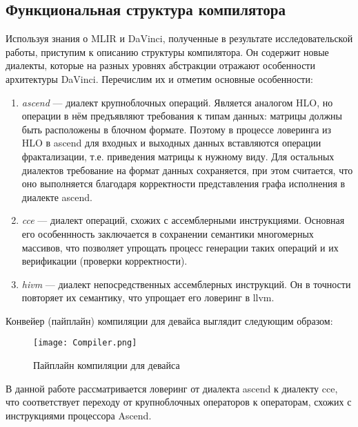 \subsection{Функциональная структура компилятора}
\label{impl:compiler} %

Используя знания о MLIR и DaVinci, полученные в результате исследовательской
работы, приступим к описанию структуры компилятора. Он содержит новые диалекты,
которые на разных уровнях абстракции отражают особенности архитектуры DaVinci.
Перечислим их и отметим основные особенности:

\begin{enumerate}
    \item \textit{ascend} --- диалект крупноблочных операций. Является аналогом
          HLO, но операции в нём предъявляют требования к типам данных: матрицы
          должны быть расположены в блочном формате. Поэтому в процессе ловеринга
          из HLO в ascend для входных и выходных данных вставляются операции
          фрактализации, т.е. приведения матрицы к нужному виду. Для остальных
          диалектов требование на формат данных сохраняется, при этом считается,
          что оно выполняется благодаря корректности представления графа
          исполнения в диалекте ascend.

    \item \textit{cce} --- диалект операций, схожих с ассемблерными инструкциями.
          Основная его особеннность заключается в сохранении семантики
          многомерных массивов, что позволяет упрощать процесс генерации таких
          операций и их верификации (проверки корректности).

    \item \textit{hivm} --- диалект непосредственных ассемблерных инструкций. Он в
          точности повторяет их семантику, что упрощает его ловеринг в llvm.
\end{enumerate}

Конвейер (пайплайн) компиляции для девайса выглядит следующим образом:

\begin{figure}[h!]
      \centering
      \texttt{[image: Compiler.png]}
      \caption{Пайплайн компиляции для девайса}
  \end{figure}

В данной работе рассматривается ловеринг от диалекта ascend к диалекту cce,
что соответствует переходу от крупноблочных операторов к операторам, схожих с
инструкциями процессора Ascend.
